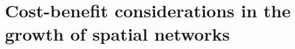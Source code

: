 \chapter{Cost-benefit considerations in the growth of spatial networks}
\label{chap:cost-benefit}


